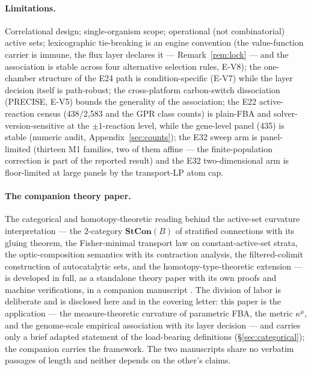 \documentclass[11pt,a4paper]{article}
\theoremstyle{plain}
\theoremstyle{definition}
\theoremstyle{remark}
\newcommand{\kmu}{\kappa^{\mu}}
\begin{document}
\paragraph{Limitations.}
Correlational design; single-organism scope; operational (not
combinatorial) active sets; lexicographic tie-breaking is an engine
convention (the value-function carrier is immune, the flux layer
declares it --- Remark~\ref{rem:lock} --- and the association is
stable across four alternative selection rules, E-V8); the
one-chamber structure of the E24 path is condition-specific (E-V7)
while the layer decision itself is path-robust; the cross-platform
carbon-switch dissociation (PRECISE, E-V5) bounds the generality of
the association; the E22 active-reaction census (438/2{,}583 and the
GPR class counts) is plain-FBA and solver-version-sensitive at the
$\pm 1$-reaction level, while the gene-level panel (435) is stable
(numeric audit, Appendix~\ref{sec:counts}); the E32 sweep arm is
panel-limited (thirteen M1 families, two of them affine --- the
finite-population correction is part of the reported result) and the
E32 two-dimensional arm is floor-limited at large panels by the
transport-LP atom cap.

\paragraph{The companion theory paper.}
The categorical and homotopy-theoretic reading behind the
active-set curvature interpretation --- the $2$-category
$\mathbf{StCon}(B)$ of stratified connections with its gluing
theorem, the Fisher-minimal transport law on constant-active-set
strata, the optic-composition semantics with its contraction
analysis, the filtered-colimit construction of autocatalytic sets,
and the homotopy-type-theoretic extension --- is developed in full,
as a standalone theory paper with its own proofs and machine
verifications, in a companion manuscript \citep{zai2026categorical}.
The division of labor is deliberate and is disclosed here and in the
covering letter: this paper is the application --- the
measure-theoretic curvature of parametric FBA, the metric $\kmu$,
and the genome-scale empirical association with its layer decision
--- and carries only a brief adapted statement of the load-bearing
definitions (\S\ref{sec:categorical}); the companion carries the
framework. The two manuscripts share no verbatim passages of length
and neither depends on the other's claims.
\end{document}
